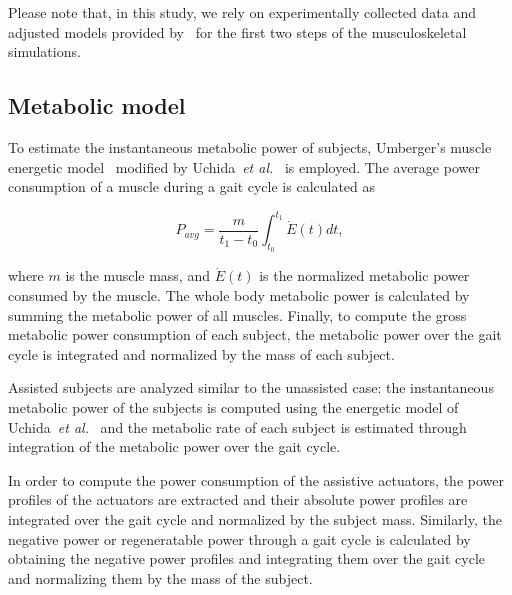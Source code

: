 \documentclass[10pt,letterpaper]{article}
\newcommand{\etal}{\textit{et al.}}
\begin{document}
Please note that, in this study, we rely on experimentally collected data and adjusted models provided by~\cite{Dembia2017} for the first two steps of the musculoskeletal simulations.



\subsection*{Metabolic model} To estimate the instantaneous metabolic power of subjects, Umberger's muscle energetic model~\cite{Umberger2003} modified by Uchida~\etal~\cite{Uchida2016_metabolic_model} is employed. The average power consumption of a muscle during a gait cycle is calculated as

\begin{equation}\label{Eqn_avg_muscle_power}
	P_{avg} = \frac{m}{t_1 - t_0}\int_{t_0}^{t_1} \dot{E}(t) dt,
\end{equation}

\noindent where $m$ is the muscle mass, and $\dot{E}(t)$ is the normalized metabolic power consumed by the muscle. The whole body metabolic power is calculated by summing the metabolic power of all muscles. Finally, to compute the gross metabolic power consumption of each subject,  the metabolic power over the gait cycle is integrated and normalized by the mass of each subject.

Assisted subjects are analyzed similar to the unassisted case: the instantaneous metabolic power of the subjects is computed using the energetic model of Uchida~\etal~\cite{Uchida2016_metabolic_model} and the metabolic rate of each subject is estimated through integration of the metabolic power over the gait cycle.

In order to compute the power consumption of the assistive actuators, the power profiles of the actuators are extracted and their absolute power profiles are integrated over the gait cycle and normalized by the subject mass. Similarly, the negative power or regeneratable power through a gait cycle is calculated by obtaining the negative power profiles and integrating them over the gait cycle and normalizing them by the mass of the subject.
\end{document}
